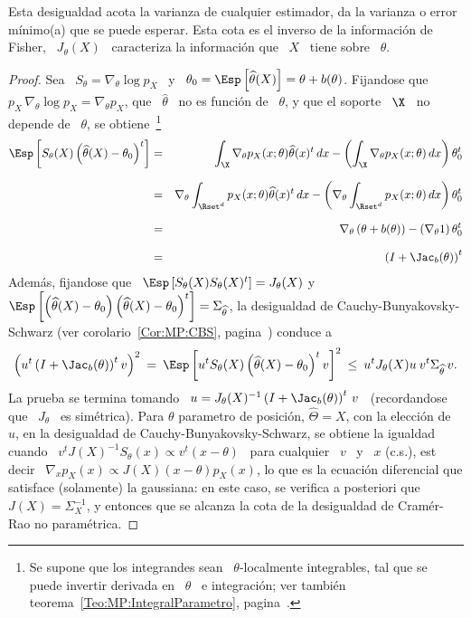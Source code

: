 %
\noindent Esta desigualdad  acota la varianza de cualquier  estimador, \ie da la
varianza o error m\'inimo(a) que se puede esperar. Esta cota es el inverso de la
informaci\'on de Fisher, \ie \  $J_\theta(X)$ \ caracteriza la informaci\'on que
\ $X$ \ tiene sobre \ $\theta$.
%
\begin{proof}
  Sea  \   $S_\theta  =  \nabla_\theta  \log   p_X$  \  y  \   $\theta_0  =  \Esp\left[
    \widehat{\theta}(X) \right] = \theta +  b(\theta)$.  Fijandose que \ $p_X \,
  \nabla_\theta \log p_X = \nabla_\theta  p_X$, que \ $\widehat{\theta}$ \ no es
  funci\'on de \ $\theta$,  y que el soporte \ $\X$ \  no depende de \ $\theta$,
  se obtiene~\footnote{Se supone que  los integrandes sean \ $\theta$-localmente
    integrables,  tal  que  se  puede  invertir  derivada  en  \  $\theta$  \  e
    integraci\'on;    ver    tambi\'en    teorema~\ref{Teo:MP:IntegralParametro},
    pagina~\pageref{Teo:MP:IntegralParametro}.}
  \begin{eqnarray*}
  \Esp\left[ S_\theta(X) \left( \widehat{\theta}(X) - \theta_0 \right)^t \right] & = &
  \int_\X \nabla_\theta p_X(x;\theta) \widehat{\theta}(x)^t \, dx - \left(
  \int_\X \nabla_\theta p_X(x;\theta) \, dx \right) \theta_0^t\\[2.5mm]
  & = & \nabla_\theta \int_{\Rset^d} p_X(x;\theta) \widehat{\theta}(x)^t \, dx -
  \left( \nabla_\theta \int_{\Rset^d} p_X(x;\theta) \, dx \right)
  \theta_0^t\\[2.5mm]
  & = & \nabla_\theta \left( \theta + b(\theta) \right)  - 
  \left( \nabla_\theta 1 \right) \theta_0^t\\[2.5mm]
  & = & \left( I + \Jac_b(\theta) \right)^t
  \end{eqnarray*}
  Adem\'as, fijandose  que \  $\Esp\left[ S_\theta(X) S_\theta(X)^t  \right] =  J_\theta(X)$ y
  $\Esp\left[   \left(    \widehat{\theta}(X)   -   \theta_0    \right)   \left(
      \widehat{\theta}(X)      -      \theta_0      \right)^t     \right]      =
  \Sigma_{\widehat{\theta}}$, la  desigualdad de Cauchy-Bunyakovsky-Schwarz (ver
  corolario~\ref{Cor:MP:CBS}, pagina~\pageref{Cor:MP:CBS}) conduce a
  \[
  \left( u^t \left( I + \Jac_b(\theta)  \right)^t v \right)^2 \: = \: \Esp\left[
    u^t S_\theta(X) \left( \widehat{\theta}(X) -  \theta_0 \right)^t v \right]^2 \: \le
  \: u^t J_\theta(X) u \: v^t \Sigma_{\widehat{\theta}} \, v.
  \]
  La prueba se termina tomando \ $u = J_\theta(X)^{-1} \left( I + \Jac_b(\theta)
  \right)^t \,  v$ \ (recordandose  que \ $J_\theta$ \  es sim\'etrica).\newline
  Para  $\theta$  parametro  de  posici\'on,  $\widehat{\Theta}  =  X$,  con  la
  elecci\'on  de \  $u$,  en la  desigualdad  de Cauchy-Bunyakovsky-Schwarz,  se
  obtiene la igualdad  cuando \ $v^t J(X)^{-1} S_\theta(x) \propto v^t  (x - \theta)$ \
  para cualquier \ $v$  \ y \ $x$ (c.s.), est decir  \ $\nabla_x p_X (x) \propto
  J(X) (x -  \theta) p_X(x)$, lo que es la  ecuaci\'on diferencial que satisface
  (solamente) la gaussiana: en este caso, se verifica a posteriori que \ $J(X) =
  \Sigma_X^{-1}$,  y  entonces que  se  alcanza la  cota  de  la desigualdad  de
  Cram\'er-Rao no param\'etrica.
\end{proof}
